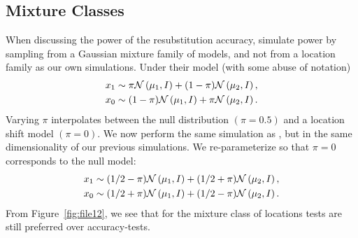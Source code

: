 \documentclass[]{bio}
\begin{document}
\subsection{Mixture Classes}


When discussing the power of the resubstitution accuracy, \cite{golland_permutation_2005} simulate power by sampling from a Gaussian mixture family of models, and not from a location family as our own simulations. 
Under their model (with some abuse of notation)
\begin{align*}
\begin{split}
x_1 & \sim \pi \mathcal{N}\left(\mu_1,I\right)+ (1-\pi) \mathcal{N}\left(\mu_2,I\right), \\
x_0 & \sim (1-\pi) \mathcal{N}\left(\mu_1,I\right)+ \pi \mathcal{N}\left(\mu_2,I\right).
\end{split}
\end{align*}
Varying $\pi$ interpolates between the null distribution $(\pi=0.5)$ and a location shift model $(\pi=0)$. 
We now perform the same simulation as \cite{golland_permutation_2005}, but in the same dimensionality of our previous simulations.
We re-parameterize so that $\pi=0$ corresponds to the null model:
\begin{align}
\begin{split}
\label{eq:mixture_alternative}
x_1 & \sim (1/2-\pi) \mathcal{N}\left(\mu_1,I\right)+ (1/2+\pi) \mathcal{N}\left(\mu_2,I\right), \\
x_0 & \sim (1/2+\pi) \mathcal{N}\left(\mu_1,I\right)+ (1/2-\pi) \mathcal{N}\left(\mu_2,I\right).	
\end{split}
\end{align}
From Figure~\ref{fig:file12}, we see that for the mixture class of \cite{golland_permutation_2005} locations tests are still preferred over accuracy-tests. 
\end{document}

